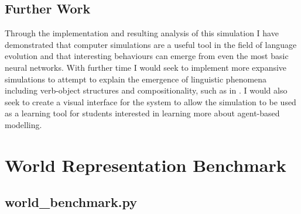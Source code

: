 \documentclass[12pt,a4paper]{report}
\begin{document}
\section{Further Work}

Through the implementation and resulting analysis of this simulation I have demonstrated that computer simulations are a useful tool in the field of language evolution and that interesting behaviours can emerge from even the most basic neural networks. With further time I would seek to implement more expansive simulations to attempt to explain the emergence of linguistic phenomena including verb-object structures and compositionality, such as in \citet{cangelosi2001evolution}. I would also seek to create a visual interface for the system to allow the simulation to be used as a learning tool for students interested in learning more about agent-based modelling. 




\appendix

\chapter{World Representation Benchmark}\label{chapter:benchmark}

\section{world\_benchmark.py}
{\scriptsize}
\end{document}
